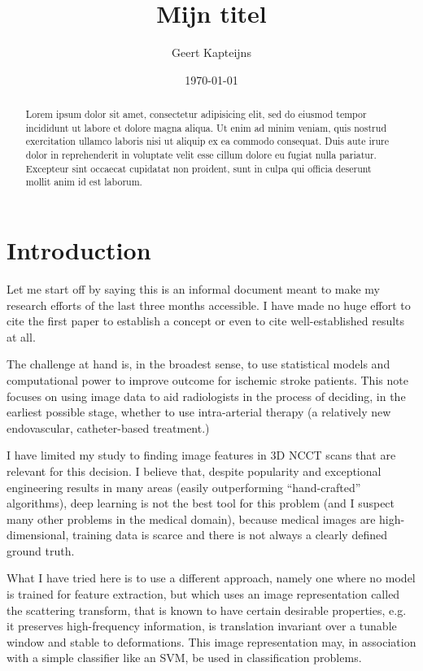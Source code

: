 \documentclass[twocolumn, openany, oneside, article]{memoir}
\title{Mijn titel}
\author{Geert Kapteijns}
\date{\today}
\begin{document}
\maketitle
\pagestyle{simple}

\begin{abstract}

Lorem ipsum dolor sit amet, consectetur adipisicing elit, sed do eiusmod
tempor incididunt ut labore et dolore magna aliqua. Ut enim ad minim veniam,
quis nostrud exercitation ullamco laboris nisi ut aliquip ex ea commodo
consequat. Duis aute irure dolor in reprehenderit in voluptate velit esse
cillum dolore eu fugiat nulla pariatur. Excepteur sint occaecat cupidatat non
proident, sunt in culpa qui officia deserunt mollit anim id est laborum.

\end{abstract}

\chapter{Introduction}

Let me start off by saying this is an informal document meant to make my
research efforts of the last three months accessible. I have made no huge effort
to cite the first paper to establish a concept or even to cite well-established
results at all.

The challenge at hand is, in the broadest sense, to use statistical models and computational power to improve outcome
for ischemic stroke patients. This note focuses on using image data to aid radiologists in the process of deciding, in
the earliest possible stage, whether to use intra-arterial therapy (a relatively new endovascular, catheter-based
treatment.)

I have limited my study to finding image features in 3D NCCT scans that are relevant for this decision. I believe that,
despite popularity and exceptional engineering results in many areas (easily outperforming \enquote{hand-crafted}
algorithms), deep learning is not the best tool for this problem (and I suspect many other problems in the medical
domain), because medical images are high-dimensional, training data is scarce and there is not always a clearly defined
ground truth.

What I have tried here is to use a different approach, namely one where no model is trained for feature extraction, but
which uses an image representation called the scattering transform, that is known to have certain desirable properties,
e.g. it preserves high-frequency information, is translation invariant over a tunable window and stable to deformations.
This image representation may, in association with a simple classifier like an SVM, be used in classification problems.
\end{document}
